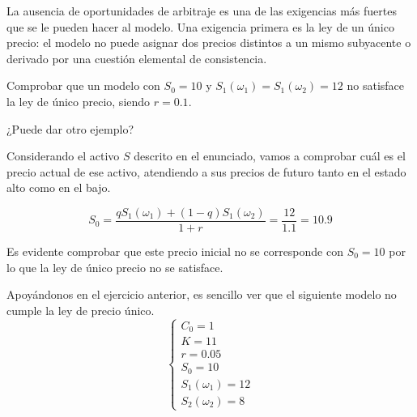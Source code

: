 \begin{problem}[4]
La ausencia de oportunidades de arbitraje es una de las exigencias más fuertes que se le pueden hacer al modelo. Una exigencia primera es la ley de un único precio: el modelo no puede asignar dos precios distintos a un mismo subyacente o derivado por una cuestión elemental de consistencia.

\ppart Comprobar que un modelo con $S_0 = 10$ y $S_1(ω_1)=S_1(ω_2)=12$ no satisface la ley de único precio, siendo $r=0.1$.

\ppart ¿Puede dar otro ejemplo?
\solution

\spart
Considerando el activo $S$ descrito en el enunciado, vamos a comprobar cuál es el precio actual de ese activo, atendiendo a sus precios de futuro tanto en el estado alto como en el bajo.

\[S_0 = \frac{qS_1(ω_1) + (1-q)S_1(ω_2)}{1+r} = \frac{12}{1.1}=10.9\]

Es evidente comprobar que este precio inicial no se corresponde con $S_0=10$ por lo que la ley de único precio no se satisface.

\spart

Apoyándonos en el ejercicio anterior, es sencillo ver que el siguiente modelo no cumple la ley de precio único.
\[\left\{\begin{array}{l}
C_0 = 1 \\
K = 11 \\
r = 0.05\\
S_0 = 10 \\
S_1(ω_1) = 12\\
S_2(ω_2) = 8
\end{array}\right.\]


\end{problem}

